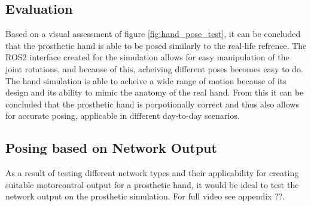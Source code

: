 \documentclass[../main.tex]{subfiles}
\begin{document}

\subsection{Evaluation}

Based on a visual assessment of figure \ref{fig:hand_pose_test}, it can be concluded that the prosthetic hand is able to be posed similarly to the real-life refrence.
The ROS2 interface created for the simulation allows for easy manipulation of the joint rotations, and because of this, acheiving different poses becomes easy to do.
The hand simulation is able to acheive a wide range of motion because of its design and its ability to mimic the anatomy of the real hand.
From this it can be concluded that the prosthetic hand is porpotionally correct and thus also allows for accurate posing, applicable in different day-to-day scenarios.

\subsection{Posing based on Network Output}

As a result of testing different network types and their applicability for creating suitable motorcontrol output for a prosthetic hand, it would be ideal to test the network output on the prosthetic simulation.
For full video see appendix ??.

\end{document}
